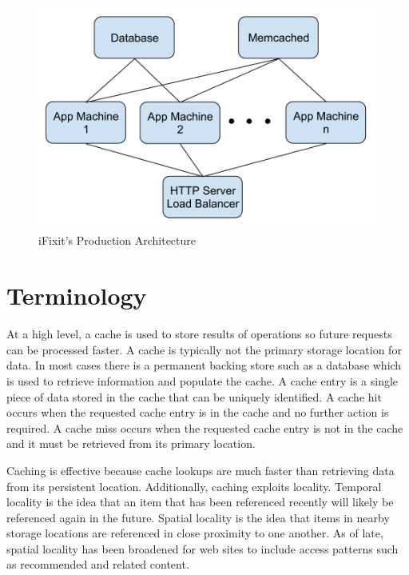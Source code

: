 \documentclass[12pt]{ucthesis}
\begin{document}
\begin{figure}[h]
\centering
\includegraphics[width=\textwidth]{assets/iFixitArchitecture.png}
\caption{iFixit's Production Architecture}
\label{fig:iFixitArchitecture}
\end{figure}

\section{Terminology}
At a high level, a cache is used to store results of operations so future requests can be processed faster.
A cache is typically not the primary storage location for data.
In most cases there is a permanent backing store such as a database which is used to retrieve information and populate the cache.
A cache entry is a single piece of data stored in the cache that can be uniquely identified.
A cache hit occurs when the requested cache entry is in the cache and no further action is required.
A cache miss occurs when the requested cache entry is not in the cache and it must be retrieved from its primary location.

Caching is effective because cache lookups are much faster than retrieving data from its persistent location.
Additionally, caching exploits locality.
Temporal locality is the idea that an item that has been referenced recently will likely be referenced again in the future.
Spatial locality is the idea that items in nearby storage locations are referenced in close proximity to one another.
As of late, spatial locality has been broadened for web sites to include access patterns such as recommended and related content.
\end{document}
